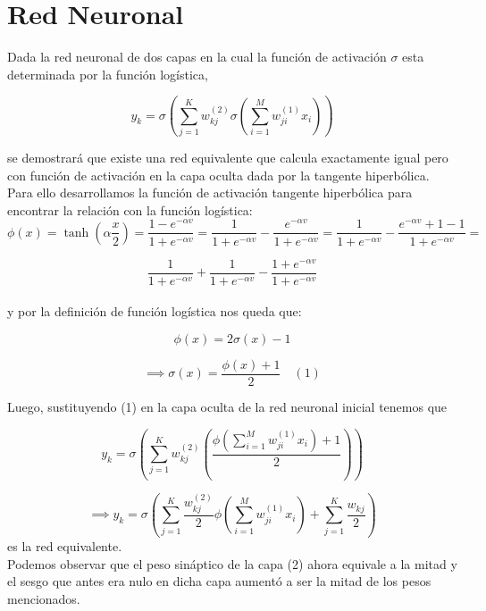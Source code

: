 \documentclass[a4paper]{article}
\theoremstyle{definition}
\theoremstyle{plain}
\begin{document}
\section{Red Neuronal}

Dada la red neuronal de dos capas en la cual la función de activación $\sigma$ esta determinada por la función logística,

$$ y_k = \sigma \left(\sum_{j=1}^{K} w_{kj}^{(2)} \sigma \left( \sum_{i=1}^{M} w_{ji}^{(1)}x_i \right ) \right)$$

se demostrará que existe una red equivalente que calcula exactamente igual pero con función de activación en la capa oculta dada por la tangente hiperbólica.\\


Para ello desarrollamos la función de activación tangente hiperbólica para encontrar la relación con la función logística: 
$$\phi (x)= \tanh \left( \alpha \frac{x}{2} \right) =  \frac{1 - e^{- \alpha v}}{1 + e^{- \alpha v}} = \frac{1}{1 + e^{- \alpha v}} - \frac{e^{- \alpha v}}{1 + e^{- \alpha v}} = \frac{1}{1 + e^{- \alpha v}} - \frac{e^{- \alpha v} + 1 - 1}{1 + e^{- \alpha v}} = $$ 

$$\frac{1}{1 + e^{- \alpha v}} + \frac{1}{1 + e^{- \alpha v}} - \frac{1+e^{- \alpha v}}{1 + e^{- \alpha v}} $$\\
y por la definición de función logística nos queda que:

$$\phi (x) = 2\sigma(x) - 1 $$

$$ \implies
\sigma(x) = \frac{\phi (x) + 1}{2} \quad (1)$$

Luego, sustituyendo (1) en la capa oculta de la red neuronal inicial tenemos que

$$ y_k = \sigma \left(\sum_{j=1}^{K} w_{kj}^{(2)} \left( \frac{\phi \left( \sum_{i=1}^{M} w_{ji}^{(1)}x_i \right ) + 1}{2}\right) \right)$$

$$ \implies y_k = \sigma \left(\sum_{j=1}^{K} \frac{w_{kj}^{(2)}}{2} \phi \left( \sum_{i=1}^{M} w_{ji}^{(1)}x_i \right ) + \sum_{j=1}^{K} \frac{w_{kj}}{2}  \right)$$
es la red equivalente.\\

Podemos observar que el peso sináptico de la capa (2) ahora equivale a la mitad y el sesgo que antes era nulo en dicha capa aumentó a ser la mitad de los pesos mencionados.
\end{document}
